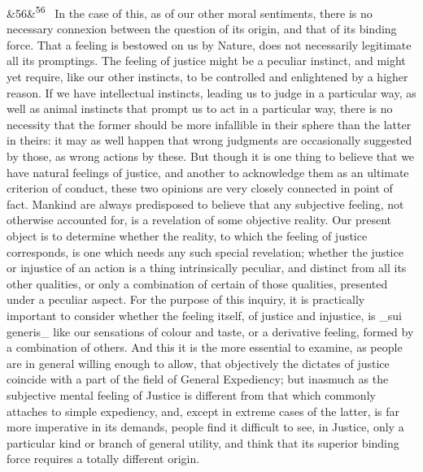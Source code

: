 \documentclass[12pt]{article}
\newcommand{\para}[1][]{\par\noindent\ifx&#1&\else\textsuperscript{\footnotesize #1}~\fi}
\begin{document}
\para[56] In the case of this, as of our other moral sentiments, there is no necessary connexion between the question of its origin, and that of its binding force. That a feeling is bestowed on us by Nature, does not necessarily legitimate all its promptings. The feeling of justice might be a peculiar instinct, and might yet require, like our other instincts, to be controlled and enlightened by a higher reason. If we have intellectual instincts, leading us to judge in a particular way, as well as animal instincts that prompt us to act in a particular way, there is no necessity that the former should be more infallible in their sphere than the latter in theirs: it may as well happen that wrong judgments are occasionally suggested by those, as wrong actions by these. But though it is one thing to believe that we have natural feelings of justice, and another to acknowledge them as an ultimate criterion of conduct, these two opinions are very closely connected in point of fact. Mankind are always predisposed to believe that any subjective feeling, not otherwise accounted for, is a revelation of some objective reality. Our present object is to determine whether the reality, to which the feeling of justice corresponds, is one which needs any such special revelation; whether the justice or injustice of an action is a thing intrinsically peculiar, and distinct from all its other qualities, or only a combination of certain of those qualities, presented under a peculiar aspect. For the purpose of this inquiry, it is practically important to consider whether the feeling itself, of justice and injustice, is \_sui generis\_ like our sensations of colour and taste, or a derivative feeling, formed by a combination of others. And this it is the more essential to examine, as people are in general willing enough to allow, that objectively the dictates of justice coincide with a part of the field of General Expediency; but inasmuch as the subjective mental feeling of Justice is different from that which commonly attaches to simple expediency, and, except in extreme cases of the latter, is far more imperative in its demands, people find it difficult to see, in Justice, only a particular kind or branch of general utility, and think that its superior binding force requires a totally different origin.
\end{document}
